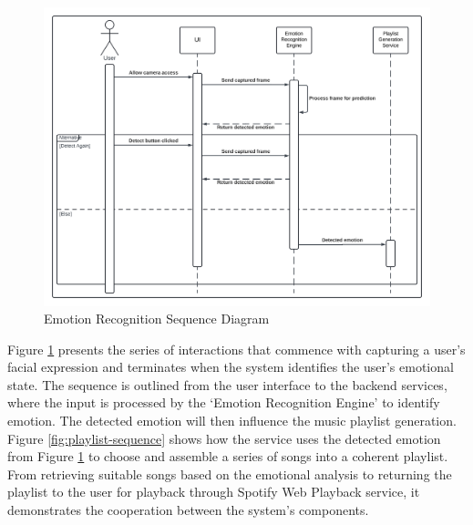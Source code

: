 \begin{figure}[H]
    \centering
    \includegraphics[width=16cm]{Images/fer-sequence.png}
    \caption{Emotion Recognition Sequence Diagram}
    \label{fig:fer-sequence}
\end{figure}
\indent Figure \ref{fig:fer-sequence} presents the series of interactions that commence with capturing a user's facial expression and terminates when the system identifies the user's emotional state.
The sequence is outlined from the user interface to the backend services, where the input is processed by the `Emotion Recognition Engine' to identify emotion. 
The detected emotion will then influence the music playlist generation. 
\\
\indent Figure \ref{fig:playlist-sequence} shows how the service uses the detected emotion from Figure \ref{fig:fer-sequence} to choose and assemble a series of songs into a coherent playlist.
From retrieving suitable songs based on the emotional analysis to returning the playlist to the user for playback through Spotify Web Playback service, it demonstrates the cooperation between the system's components.
\\
